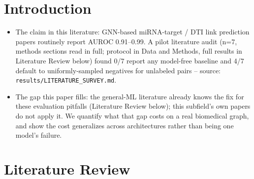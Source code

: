 \documentclass{bmcart}
\begin{document}

\section*{Introduction}
\begin{itemize}
\item The claim in this literature: GNN-based miRNA-target / DTI link prediction papers
routinely report AUROC 0.91--0.99. A pilot literature audit (n=7, methods sections read
in full; protocol in Data and Methods, full results in Literature Review below) found
0/7 report any model-free baseline and 4/7 default to uniformly-sampled negatives for
unlabeled pairs -- source: \texttt{results/LITERATURE\_SURVEY.md}.
\item The gap this paper fills: the general-ML literature already knows the fix for
these evaluation pitfalls (Literature Review below); this subfield's own papers do not
apply it. We quantify what that gap costs on a real biomedical graph, and show the cost
generalizes across architectures rather than being one model's failure.
\end{itemize}

\section*{Literature Review}
\end{document}
